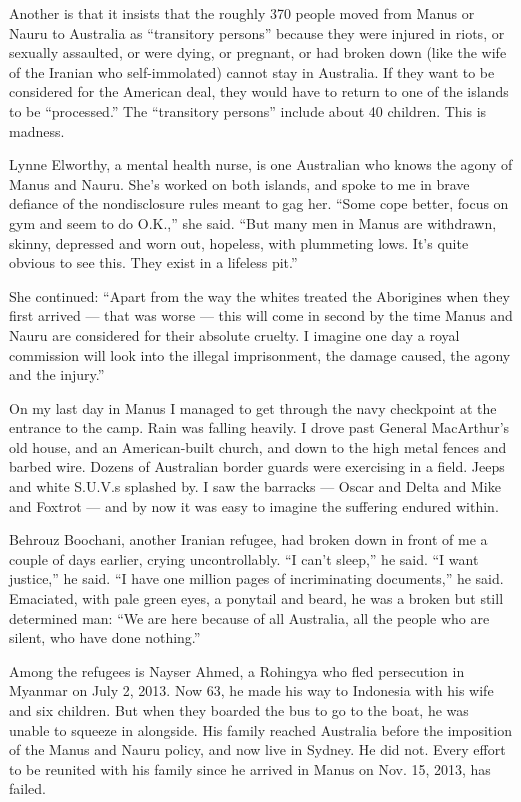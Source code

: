 Another is that it insists that the roughly 370 people moved from Manus
or Nauru to Australia as ``transitory persons'' because they were
injured in riots, or sexually assaulted, or were dying, or pregnant, or
had broken down (like the wife of the Iranian who self-immolated) cannot
stay in Australia. If they want to be considered for the American deal,
they would have to return to one of the islands to be ``processed.'' The
``transitory persons'' include about 40 children. This is madness.

Lynne Elworthy, a mental health nurse, is one Australian who knows the
agony of Manus and Nauru. She's worked on both islands, and spoke to me
in brave defiance of the nondisclosure rules meant to gag her. ``Some
cope better, focus on gym and seem to do O.K.,'' she said. ``But many
men in Manus are withdrawn, skinny, depressed and worn out, hopeless,
with plummeting lows. It's quite obvious to see this. They exist in a
lifeless pit.''

She continued: ``Apart from the way the whites treated the Aborigines
when they first arrived --- that was worse --- this will come in second
by the time Manus and Nauru are considered for their absolute cruelty. I
imagine one day a royal commission will look into the illegal
imprisonment, the damage caused, the agony and the injury.''

On my last day in Manus I managed to get through the navy checkpoint at
the entrance to the camp. Rain was falling heavily. I drove past General
MacArthur's old house, and an American-built church, and down to the
high metal fences and barbed wire. Dozens of Australian border guards
were exercising in a field. Jeeps and white S.U.V.s splashed by. I saw
the barracks --- Oscar and Delta and Mike and Foxtrot --- and by now it
was easy to imagine the suffering endured within.

Behrouz Boochani, another Iranian refugee, had broken down in front of
me a couple of days earlier, crying uncontrollably. ``I can't sleep,''
he said. ``I want justice,'' he said. ``I have one million pages of
incriminating documents,'' he said. Emaciated, with pale green eyes, a
ponytail and beard, he was a broken but still determined man: ``We are
here because of all Australia, all the people who are silent, who have
done nothing.''

Among the refugees is Nayser Ahmed, a Rohingya who fled persecution in
Myanmar on July 2, 2013. Now 63, he made his way to Indonesia with his
wife and six children. But when they boarded the bus to go to the boat,
he was unable to squeeze in alongside. His family reached Australia
before the imposition of the Manus and Nauru policy, and now live in
Sydney. He did not. Every effort to be reunited with his family since he
arrived in Manus on Nov. 15, 2013, has failed.


